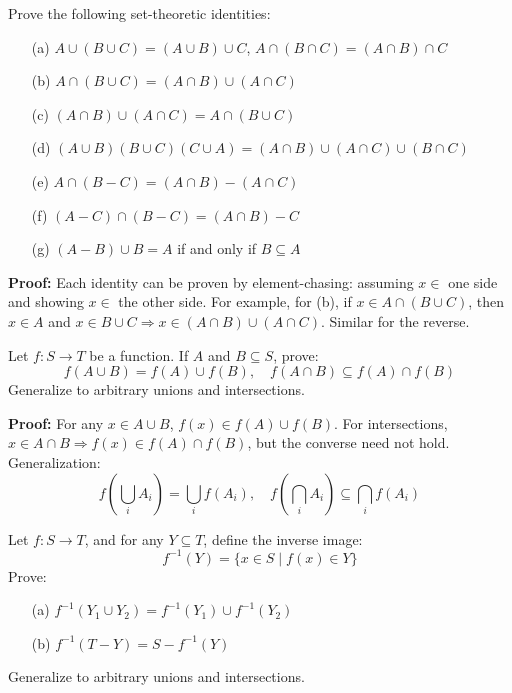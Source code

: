 \begin{problembox}
Prove the following set-theoretic identities:
\begin{itemize}
\item[(a)] \( A \cup (B \cup C) = (A \cup B) \cup C \), \quad \( A \cap (B \cap C) = (A \cap B) \cap C \)
\item[(b)] \( A \cap (B \cup C) = (A \cap B) \cup (A \cap C) \)
\item[(c)] \( (A \cap B) \cup (A \cap C) = A \cap (B \cup C) \)
\item[(d)] \( (A \cup B)(B \cup C)(C \cup A) = (A \cap B) \cup (A \cap C) \cup (B \cap C) \)
\item[(e)] \( A \cap (B - C) = (A \cap B) - (A \cap C) \)
\item[(f)] \( (A - C) \cap (B - C) = (A \cap B) - C \)
\item[(g)] \( (A - B) \cup B = A \) if and only if \( B \subseteq A \)
\end{itemize}
\end{problembox}

\textbf{Proof:}  
Each identity can be proven by element-chasing: assuming \( x \in \) one side and showing \( x \in \) the other side.  
For example, for (b), if \( x \in A \cap (B \cup C) \), then \( x \in A \) and \( x \in B \cup C \Rightarrow x \in (A \cap B) \cup (A \cap C) \). Similar for the reverse.

\begin{problembox}
Let \( f: S \to T \) be a function. If \( A \) and \( B \subseteq S \), prove:
\[
f(A \cup B) = f(A) \cup f(B), \quad f(A \cap B) \subseteq f(A) \cap f(B)
\]
Generalize to arbitrary unions and intersections.
\end{problembox}

\textbf{Proof:}  
For any \( x \in A \cup B \), \( f(x) \in f(A) \cup f(B) \).  
For intersections, \( x \in A \cap B \Rightarrow f(x) \in f(A) \cap f(B) \), but the converse need not hold.  
Generalization:  
\[
f\left( \bigcup_i A_i \right) = \bigcup_i f(A_i), \quad f\left( \bigcap_i A_i \right) \subseteq \bigcap_i f(A_i)
\]

\begin{problembox}
Let \( f: S \to T \), and for any \( Y \subseteq T \), define the inverse image:
\[
f^{-1}(Y) = \{x \in S \mid f(x) \in Y \}
\]
Prove:
\begin{itemize}
\item[(a)] \( f^{-1}(Y_1 \cup Y_2) = f^{-1}(Y_1) \cup f^{-1}(Y_2) \)
\item[(b)] \( f^{-1}(T - Y) = S - f^{-1}(Y) \)
\end{itemize}
Generalize to arbitrary unions and intersections.
\end{problembox}


